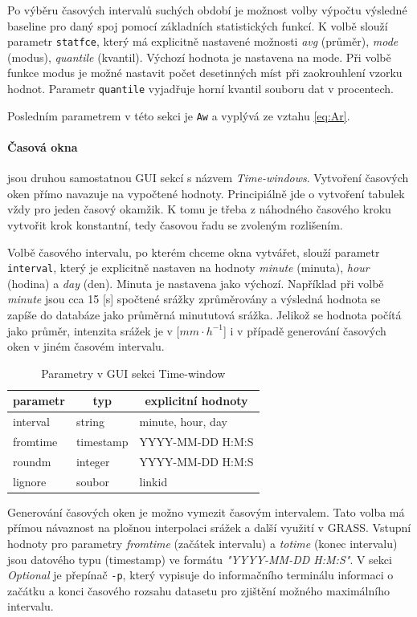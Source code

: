 \documentclass[a4paper,12pt,oneside]{report}
\begin{document}
Po výběru časových intervalů suchých období je možnost volby výpočtu výsledné baseline
pro daný spoj pomocí základních statistických funkcí. K volbě slouží
parametr \texttt{statfce}, který má explicitně nastavené možnosti
\emph{avg} (průměr), \emph{mode} (modus), \emph{quantile}
(kvantil). Výchozí hodnota je nastavena na mode. Při volbě funkce
modus je možné nastavit počet desetinných míst při zaokrouhlení vzorku
hodnot. Parametr \texttt{quantile} vyjadřuje horní kvantil souboru dat
v procentech.

Posledním parametrem v této sekci je \texttt{Aw} a vyplývá ze vztahu
\ref{eq:Ar}.


\paragraph*{Časová okna} jsou druhou samostatnou GUI sekcí s názvem
\textit{Time-windows}. Vytvo\-ření časových oken přímo navazuje na
vypočtené hodnoty. Principiálně jde o vytvoření tabulek vždy pro jeden
časový okamžik. K tomu je třeba z náhodného časového kroku vytvořit
krok konstantní, tedy časovou řadu se zvoleným rozlišením.

Volbě časového intervalu, po kterém chceme okna vytvářet, slouží
parametr \texttt{interval}, který je explicitně nastaven na hodnoty
\emph{minute} (minuta), \emph{hour} (hodina) a \emph{day}
(den). Minuta je nastavena jako výchozí.  Například při volbě
\emph{minute} jsou cca 15 [s] spočtené srážky zprůměrovány a výsledná
hodnota se zapíše do databáze jako průměrná minututová srážka. Jelikož
se hodnota počítá jako průměr, intenzita srážek je v [$mm \cdot
h^{-1}$] i v případě generování časových oken v jiném časovém
intervalu.
\begin{table}[h]
\centering
\begin{tabular}{|lll|}
\hline
\multicolumn{1}{|c}{parametr} & \multicolumn{1}{c}{typ} & \multicolumn{1}{c|}{explicitní hodnoty} \\ \hline\hline
interval                               & string                  & minute, hour, day             \\
fromtime                               & timestamp               & YYYY-MM-DD H:M:S              \\
roundm                                 & integer                 & YYYY-MM-DD H:M:S              \\
lignore                                & soubor                  & linkid                        \\ \hline
\end{tabular}
\caption{Parametry v GUI sekci Time-window}
\label{my-label}
\end{table}
Generování časových oken je možno vymezit časovým intervalem. Tato
volba má přímou návaznost na plošnou interpolaci srážek a další
využití v GRASS. Vstupní hodnoty pro parametry \textit{fromtime}
(začátek intervalu) a \textit{totime} (konec intervalu) jsou datového
typu (timestamp) ve formátu \emph{"YYYY-MM-DD H:M:S"}. V sekci
\textit{Optional} je přepínač \texttt{-p}, který vypisuje do
informačního terminálu informaci o začátku a konci časového rozsahu
datasetu pro zjištění možného maximálního intervalu.
\end{document}
